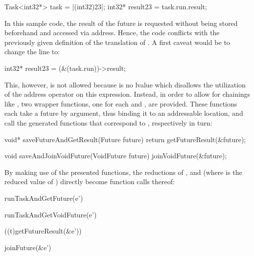 \begin{ccode}
Task<int32*> task = |(int32)23|;
int32* result23 = task.run.result;
\end{ccode}

In this sample code, the result of the future is requested without being stored beforehand and accessed via address. Hence, the code conflicts with the previously given definition of the translation of . A first caveat would be to change the line to:

\begin{ccode}
int32* result23 = (&(task.run))->result;
\end{ccode}

This, however, is not allowed because  is no lvalue \cite[pp.~147-148]{CPrimerPlus} which disallows the utilization of the address operator on this expression. Instead, in order to allow for chainings like , two wrapper functions, one for each  and , are provided. These functions each take a future by argument, thus binding it to an addressable location, and call the generated functions that correspond to , respectively  in turn:
\begin{ccode}
void* saveFutureAndGetResult(Future future) { 
  return getFutureResult(&future); 
}

void saveAndJoinVoidFuture(VoidFuture future) { 
  joinVoidFuture(&future); 
}
\end{ccode}

By making use of the presented functions, the reductions of ,  and  (where  is the reduced value of ) directly become function calls thereof:

\begin{minipage}{0.5\textwidth}
\begin{ccode}
runTaskAndGetFuture(e')
\end{ccode}
\end{minipage}
\begin{minipage}{0.5\textwidth}
\begin{ccode}
runTaskAndGetVoidFuture(e')
\end{ccode}
\end{minipage}

\begin{minipage}{0.5\textwidth}
\begin{ccode}
((t)getFutureResult(&e'))
\end{ccode}
\end{minipage}
\begin{minipage}{0.5\textwidth}
\begin{ccode}
joinFuture(&e')
\end{ccode}
\end{minipage}

